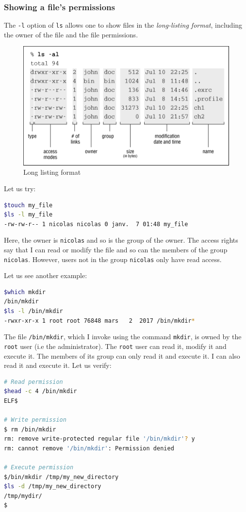 \documentclass[12pt]{article}
\begin{document}
\subsubsection{Showing a file's permissions}
The \texttt{-l} option of \texttt{ls} allows one to show files in the \textit{long-listing format}, including the owner of the file and the file permissions.

\begin{figure}[!h]\centering\captionsetup{}
   \includegraphics[scale = 0.65]
{resources/llformat.png}
   \caption{Long listing format}
\end{figure}


Let us try:
\begin{lstlisting}[language=bash]
$touch my_file
$ls -l my_file 
-rw-rw-r-- 1 nicolas nicolas 0 janv.  7 01:48 my_file
\end{lstlisting}

Here, the owner is \texttt{nicolas} and so is the group of the owner. The access rights say that I can read or modify the file and so can the members of the group \texttt{nicolas}. However, users not in the group \texttt{nicolas} only have read access.

Let us see another example:

\begin{lstlisting}[language=bash]
$which mkdir
/bin/mkdir
$ls -l /bin/mkdir
-rwxr-xr-x 1 root root 76848 mars   2  2017 /bin/mkdir*
\end{lstlisting}

The file \texttt{/bin/mkdir}, which I invoke using the command \texttt{mkdir}, is owned by the \texttt{root} user (i.e the administrator). The \texttt{root} user can read it, modify it and execute it. The members of its group can only read it and execute it. I can also read it and execute it. Let us verify:

\begin{lstlisting}[language=bash]
# Read permission
$head -c 4 /bin/mkdir
ELF$

# Write permission
$ rm /bin/mkdir 
rm: remove write-protected regular file '/bin/mkdir'? y
rm: cannot remove '/bin/mkdir': Permission denied

# Execute permission
$/bin/mkdir /tmp/my_new_directory
$ls -d /tmp/my_new_directory
/tmp/mydir/
$
\end{lstlisting}
\end{document}
